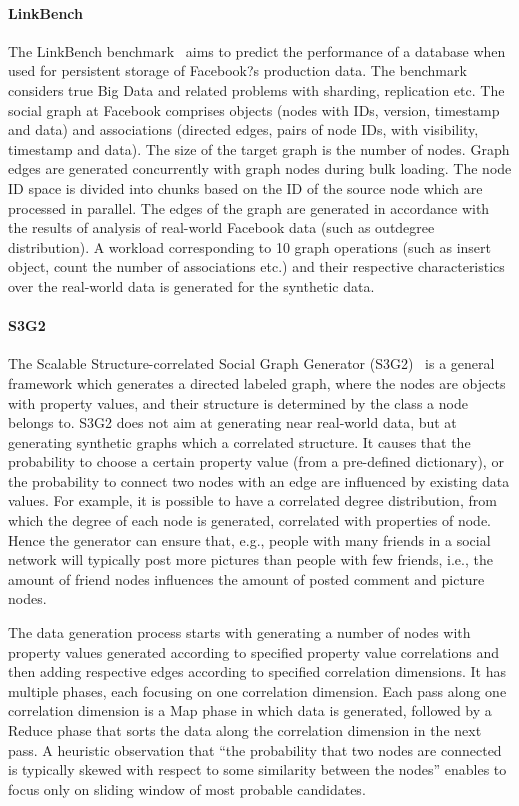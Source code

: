 \paragraph{LinkBench} The LinkBench
benchmark~\cite{Armstrong:2013:LDB:2463676.2465296} aims to predict the
performance of a database when used for persistent storage of Facebook?s
production data. The benchmark considers true Big Data and related problems with
sharding, replication etc. The social graph at Facebook comprises objects (nodes
with IDs, version, timestamp and data) and associations (directed edges, pairs
of node IDs, with visibility, timestamp and data). The size of the target graph
is the number of nodes. Graph edges are generated concurrently with graph nodes
during bulk loading. The node ID space is divided into chunks based on the ID of
the source node which  are processed in parallel. The edges of the graph are
generated in accordance with the results of analysis of real-world Facebook data
(such as outdegree distribution). A workload corresponding to 10 graph
operations (such as insert object, count the number of associations etc.) and
their respective characteristics over the real-world data is generated for the
synthetic data.

\paragraph{S3G2} The Scalable Structure-correlated Social Graph Generator
(S3G2)~\cite{Pham2013} is a general framework which  generates a directed
labeled graph, where the nodes are objects with property values, and their
structure is determined by the class a node belongs to. S3G2 does not aim at
generating near real-world data, but at generating synthetic graphs which a
correlated structure. It causes that the probability to choose a certain
property value (from a pre-defined dictionary), or the probability to connect
two nodes with an edge are influenced by existing data values. For example, it
is possible to have a correlated degree distribution, from which the degree of
each node is generated, correlated with properties of node. Hence the generator
can ensure that, e.g., people with many friends in a social network will
typically post more pictures than people with few friends, i.e., the amount of
friend nodes influences the amount of posted comment and picture nodes.

The data generation process starts with generating a number of nodes with
property values generated according to specified property value correlations and
then adding respective edges according to specified correlation dimensions. It
has multiple phases, each focusing on one correlation dimension. Each pass along
one correlation dimension is a Map phase in which data is generated, followed by
a Reduce phase that sorts the data along the correlation dimension in the next
pass. A heuristic observation that ``the probability that two nodes are
connected is typically skewed with respect to some similarity between the
nodes'' enables to focus only on sliding window of most probable candidates.


